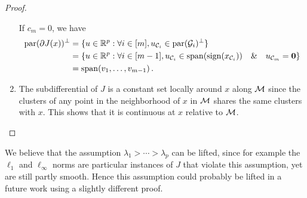 \begin{proof}
\begin{enumerate}
		      If $c_m=0$, we have
		      \begin{equation}
			      \begin{aligned}
				      \operatorname{par}(\partial J(x))^\perp & = \{ u \in \mathbb{R}^p : \forall i \in [m], u_{\mathcal{C}_i} \in \operatorname{par} (\mathcal{G}_i)^\perp \}                                             \\
				                                   & = \{ u \in \mathbb{R}^p : \forall i \in [m- 1], u_{\mathcal{C}_i} \in \operatorname{span}(\operatorname{sign}(x_{\mathcal{C}_i}))  \quad  \& \quad u_{\mathcal{C}_m} = \mathbf{0}\} \\
				                                   & = \operatorname{span}(v_1, \ldots, v_{m-1}) \, .
			      \end{aligned}
		      \end{equation}
		\item The subdifferential of $J$ is a constant set locally around $x$ along $\mathcal{M}$ since the clusters of any point in the neighborhood of $x$ in $\mathcal{M}$ shares the same clusters with $x$.
		      This shows that it is continuous at $x$ relative to $\mathcal{M}$.
	\end{enumerate}
\end{proof}

\begin{remark}
	We believe that the assumption $\lambda_1 > \cdots > \lambda_p$ can be lifted, since for example the $\ell_1$ and $\ell_\infty$ norms are particular instances of $J$ that violate this assumption, yet are still partly smooth.
	Hence this assumption could probably be lifted in a future work using a slightly different proof.
\end{remark}
